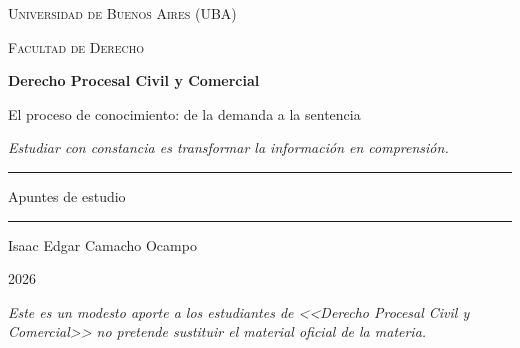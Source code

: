 \documentclass[12pt,oneside]{book}
\newcommand{\universidad}{Universidad de Buenos Aires (UBA)}
\newcommand{\facultad}{Facultad de Derecho}
\newcommand{\materia}{Derecho Procesal Civil y Comercial}
\newcommand{\titulo}{El proceso de conocimiento: de la demanda a la sentencia}
\newcommand{\autor}{Isaac Edgar Camacho Ocampo}
\newcommand{\anio}{2026}
\begin{document}

\begin{titlepage}

\thispagestyle{empty}

\begin{center}

\vspace*{1cm}

{\large \textsc{\universidad}}

\vspace{0.2cm}

{\large \textsc{\facultad}}

\vspace{3cm}

{\Huge \textbf{\materia}}

\vspace{1cm}

{\LARGE \titulo}

\vspace{0.8cm}

\textit{Estudiar con constancia es transformar la información en comprensión.}

\vspace{1.2cm}

\rule{0.70\textwidth}{0.5pt}

\vspace{0.5cm}

{\large Apuntes de estudio}

\vspace{0.5cm}

\rule{0.70\textwidth}{0.5pt}

\vfill

{\large \autor}

\vspace{0.3cm}

{\large \anio}

\end{center}

\vfill

\begin{flushleft}
\textit{Este es un modesto aporte a los estudiantes de <<\materia>> no pretende sustituir el material oficial de la materia.}
\end{flushleft}

\end{titlepage}
\end{document}
